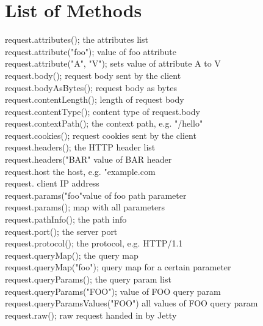 \documentclass{report}
\begin{document}
\chapter{List of Methods}
request.attributes();        \tab 					    the attributes list \\
request.attribute("foo");  \tab 				   value of foo attribute\\
request.attribute("A", "V");		\tab 		  sets value of attribute A to V\\
request.body();           \tab 						 request body sent by the client\\
request.bodyAsBytes();   \tab 			  request body as bytes\\
request.contentLength();       \tab     length of request body\\
request.contentType();         \tab    		content type of request.body\\
request.contextPath();        \tab   		the context path, e.g. "/hello"\\
request.cookies();              \tab 	 	 request cookies sent by the client\\
request.headers();             \tab 			the HTTP header list\\
request.headers("BAR"	\tab 				value of BAR header\\
request.host    \tab 							the host, e.g. "example.com\\
request. \tab  										client IP address\\
request.params("foo"\tab 				value of foo path parameter\\
request.params(); \tab    					map with all parameters\\
request.pathInfo();          \tab  				the path info\\
request.port();        \tab 						the server port\\
request.protocol();           \tab    			the protocol, e.g. HTTP/1.1\\
request.queryMap();               \tab 			the query map\\
request.queryMap("foo");          \tab 		query map for a certain parameter\\
request.queryParams();            \tab 			the query param list\\
request.queryParams("FOO");       \tab 				value of FOO query param\\
request.queryParamsValues("FOO")  \tab 			all values of FOO query param\\
request.raw();                    \tab 									raw request handed in by Jetty\\
\end{document}
